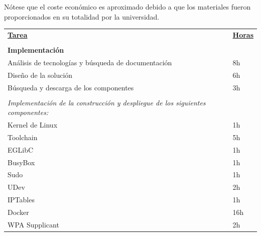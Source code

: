 \documentclass{tfg}
\begin{document}
Nótese que el coste económico es aproximado debido a que los materiales fueron proporcionados en su totalidad por la universidad.
\\
\begin{center}
\begin{tabular}{ll}
{\ul \textbf{Tarea}}                                                                  & {\ul \textbf{Horas}} \\
\\
\textbf{Implementación}                                                               &                      \\
Análisis de tecnologías y búsqueda de documentación & 8h                   \\
Diseño de la solución                                                                 & 6h                   \\
Búsqueda y descarga de los componentes                                                & 3h                   \\
\\
\textit{Implementación de la construcción y despliegue de los siguientes componentes:} &                      \\
Kernel de Linux                                                                       & 1h                   \\
Toolchain                                                                             & 5h                   \\
EGLibC                                                                                & 1h                   \\
BusyBox                                                                               & 1h                   \\
Sudo                                                                                  & 1h                   \\
UDev                                                                                  & 2h                   \\
IPTables                                                                              & 1h                   \\
Docker                                                                                & 16h                  \\
WPA Supplicant                                                                        & 2h                   \\

\end{tabular}
\end{center}
\end{document}
